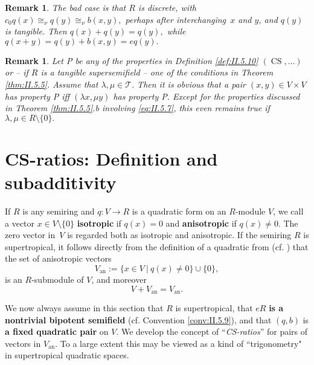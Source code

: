 \documentclass [12pt,a4paper,reqno]{amsart}
\def\00{ \{ 0 \}}
\newtheorem{remark}[thm]{Remark}
\begin{document}
\begin{remark}\label{rem:II.5.13} The bad case is that $R$ is discrete, with $c_0 q(x) {\cong_\nu} q(y) {\cong_\nu} b(x,y),$ perhaps after interchanging~$x$ and $y$, and $q(y)$ is tangible. Then $q(x) + q(y) = q(y),$ while $q(x+y) = q(y)+ b(x,y) = eq(y).$
\end{remark}

\begin{remark}\label{rem:II.5.14}
Let P be any  of the properties in Definition \ref{def:II.5.10} $({\operatorname{CS}}, \dots)$ or -- if $R$ is a tangible supersemifield -- one of the conditions in Theorem \ref{thm:II.5.5}. Assume that ${\lambda},\mu \in {\mathcal T}.$ Then it is obvious that a pair $(x,y) \in V \times V$ has property P iff $({\lambda} x, \mu y)$ has property P. Except for the properties discussed  in Theorem \ref{thm:II.5.5}.b involving \eqref{eq:II.5.7},  this even remains true if ${\lambda}, \mu \in R {\setminus} \00 .$
\end{remark}

\section{CS-ratios: Definition and subadditivity }\label{sec:II.6}

If $R$ is any semiring and $q : V \to R$ is  a quadratic form on an $R$-module $V$, we call a vector  $x \in V {\setminus} \{ 0 \}$ \textbf{isotropic} if $q(x) = 0$ and \textbf{anisotropic} if $q(x) \neq 0.$  The zero vector in~$V$ is regarded both as isotropic and  anisotropic. If the semiring $R$ is supertropical, it follows directly from the definition of a quadratic from (cf. \cite[{Eq. ({0.1})} and {Eq. ({0.2})}]{QF1}) that the set of anisotropic vectors
\begin{equation}\label{eq:II.6.1}
V_{\operatorname{an}}:=\{x\in V {\ {|} \ }q(x)\ne0\} \cup \{ 0 \},\end{equation}
is an $R$-submodule of $V$, and moreover
\begin{equation}\label{eq:II.6.2}
V+V_{\operatorname{an}} =V_{\operatorname{an}}.\end{equation}

We now always assume in this section that $R$ is supertropical,  that $eR$ {\textbf{{is a nontrivial bipotent
semifield}}} (cf. Convention \ref{conv:II.5.9}),  and that $(q,b)$ is \textbf{a
fixed quadratic pair} on $V.$ We develop the concept of
``\textit{CS-ratios}'' for pairs of vectors  in
$V_{\operatorname{an}}.$ To a large extent this may be viewed as a kind of
``trigonometry" in supertropical quadratic spaces. {\vskip 1.5mm \noindent}
\end{document}
